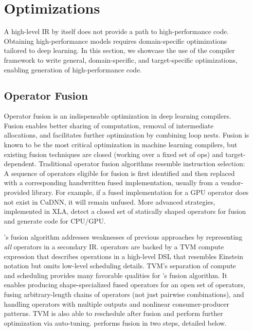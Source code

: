 \section{Optimizations}
\label{sec:optimizations}


A high-level IR by itself does not provide a path to high-performance code.
Obtaining high-performance models requires domain-specific
  optimizations tailored to deep learning.
In this section, we showcase the use of the \relay compiler framework
  to write general, domain-specific, and target-specific optimizations,
  enabling generation of high-performance code.

\subsection{Operator Fusion}
\label{sec:fusion}

Operator fusion is an indispensable optimization in deep learning compilers.
Fusion enables better sharing of computation, removal of
  intermediate allocations, and facilitates further optimization by
  combining loop nests.
Fusion is known to be the most critical optimization in machine
  learning compilers, but existing fusion techniques
  are closed (working over a fixed set of ops)
  and target-dependent.
Traditional operator fusion algorithms resemble instruction
  selection:
A sequence of operators eligible
  for fusion is first identified and then replaced with a corresponding
  handwritten fused implementation, usually from a vendor-provided library.
For example, if a fused implementation for a GPU operator does not exist in CuDNN,
  it will remain unfused.
More advanced strategies, implemented in XLA, detect a
  closed set of statically shaped operators for fusion and
  generate code for CPU/GPU.

\relay's fusion algorithm addresses weaknesses of previous approaches by representing
  \textit{all} operators in a secondary IR.
\relay operators are backed by a TVM compute expression that
  describes operations in a high-level DSL that resembles Einstein notation
  but omits low-level scheduling details.
TVM's separation of compute and scheduling provides many favorable qualities
  for \relay's fusion algorithm.
It enables producing shape-specialized fused operators for an open set of operators,
  fusing arbitrary-length chains of operators (not just pairwise combinations),
  and handling operators with multiple outputs and nonlinear consumer-producer patterns.
TVM is also able to reschedule after fusion and perform further optimization via auto-tuning.
\relay performs fusion in two steps, detailed below.


